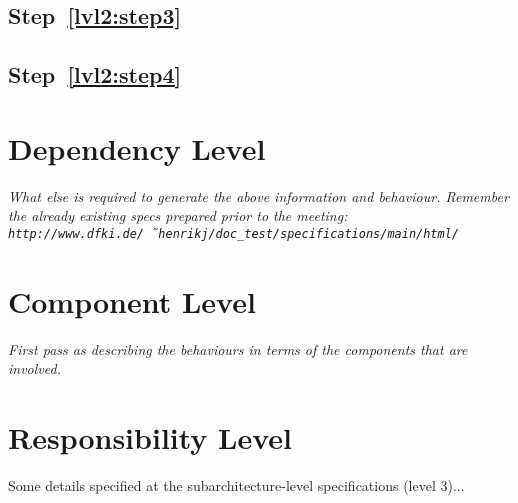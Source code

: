 \documentclass{article}
\begin{document}
\subsection{Step~\ref{lvl2:step3}}



\subsection{Step~\ref{lvl2:step4}}





\section{Dependency Level}

\textit{
  What else is required to generate the above information and
  behaviour. Remember the already existing specs prepared prior to the
  meeting: \texttt{http://www.dfki.de/\~\ henrikj/doc\_test/specifications/main/html/}}



\section{Component Level}

\textit{
  First pass as describing the behaviours in terms of the components
  that are involved.}



\section{Responsibility Level}
Some details specified at the subarchitecture-level specifications (level 3)...


\end{document}
